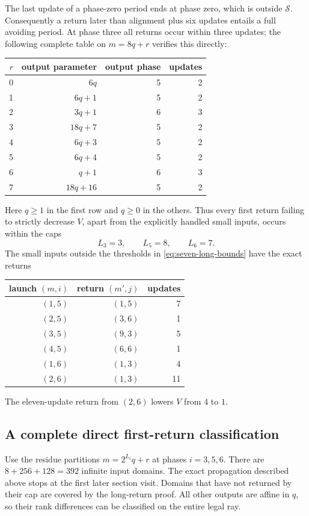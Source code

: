 The last update of a phase-zero period ends at phase zero, which is
outside $\mathcal S$.  Consequently a return later than alignment
plus six updates entails a full avoiding period.  At phase three all
returns occur within three updates; the following complete table on
$m=8q+r$ verifies this directly:
\begin{center}
\begin{tabular}{rrrr}
\hline
$r$&output parameter&output phase&updates\\ \hline
0&$6q$&5&2\\
1&$6q+1$&5&2\\
2&$3q+1$&6&3\\
3&$18q+7$&5&2\\
4&$6q+3$&5&2\\
5&$6q+4$&5&2\\
6&$q+1$&6&3\\
7&$18q+16$&5&2\\ \hline
\end{tabular}
\end{center}
Here $q\ge1$ in the first row and $q\ge0$ in the others.
Thus every first return failing to strictly decrease $V$, apart from
the explicitly handled small inputs, occurs within the caps
\begin{equation}
 L_3=3,\qquad L_5=8,\qquad L_6=7.
 \label{eq:seven-caps}
\end{equation}
The small inputs outside the thresholds in \eqref{eq:seven-long-bounds}
have the exact returns
\begin{center}
\begin{tabular}{rrr}
\hline
launch $(m,i)$&return $(m',j)$&updates\\ \hline
$(1,5)$&$(1,5)$&7\\
$(2,5)$&$(3,6)$&1\\
$(3,5)$&$(9,3)$&5\\
$(4,5)$&$(6,6)$&1\\
$(1,6)$&$(1,3)$&4\\
$(2,6)$&$(1,3)$&11\\ \hline
\end{tabular}
\end{center}
The eleven-update return from $(2,6)$ lowers $V$ from $4$ to $1$.

\subsection{A complete direct first-return classification}

Use the residue partitions $m=2^{L_i}q+r$ at phases $i=3,5,6$.
There are $8+256+128=392$ infinite input domains.  The exact propagation
described above stops at the first later section visit.  Domains that
have not returned by their cap are covered by the long-return proof.
All other outputs are affine in $q$, so their rank differences can
be classified on the entire legal ray.

